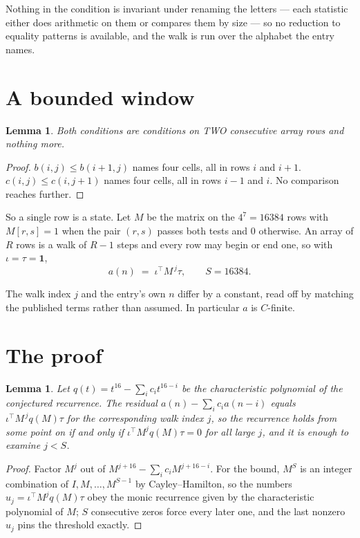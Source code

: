 \documentclass[11pt,a4paper]{article}
\theoremstyle{plain}
\newtheorem{lemma}[theorem]{Lemma}
\theoremstyle{definition}
\begin{document}
Nothing in the condition is invariant under renaming the letters --- each statistic either does
arithmetic on them or compares them by size --- so no reduction to equality patterns is
available, and the walk is run over the alphabet the entry names.

\section{A bounded window}

\begin{lemma}\label{lem:win}
Both conditions are conditions on TWO consecutive array rows and nothing more.
\end{lemma}

\begin{proof}
$b(i,j)\le b(i{+}1,j)$ names four cells, all in rows $i$ and $i+1$. $c(i,j)\le c(i,j{+}1)$
names four cells, all in rows $i-1$ and $i$. No comparison reaches further.
\end{proof}

So a single row is a state. Let $M$ be the matrix on the $4^{7}=16384$ rows with
$M[r,s]=1$ when the pair $(r,s)$ passes both tests and $0$ otherwise. An array of $R$ rows is a
walk of $R-1$ steps and every row may begin or end one, so with $\iota=\tau=\mathbf{1}$,
\[
a(n)\;=\;\iota^{\!\top}M^{\,j}\tau ,\qquad S=16384.
\]

The walk index $j$ and the entry's own $n$ differ by a constant, read off by matching the
published terms rather than assumed. In particular $a$ is $C$-finite.

\section{The proof}

\begin{lemma}\label{lem:crit}
Let $q(t)=t^{16}-\sum_i c_it^{16-i}$ be the characteristic polynomial of the
conjectured recurrence. The residual $a(n)-\sum_ic_ia(n-i)$ equals
$\iota^{\!\top}M^{\,j}q(M)\tau$ for the corresponding walk index $j$, so the recurrence
holds from some point on if and only if $\iota^{\!\top}M^{j}q(M)\tau=0$ for all large $j$,
and it is enough to examine $j<S$.
\end{lemma}

\begin{proof}
Factor $M^{j}$ out of $M^{j+16}-\sum_ic_iM^{j+16-i}$. For the bound, $M^{S}$
is an integer combination of $I,M,\dots,M^{S-1}$ by Cayley--Hamilton, so the numbers
$u_j=\iota^{\!\top}M^{j}q(M)\tau$ obey the monic recurrence given by the characteristic
polynomial of $M$; $S$ consecutive zeros force every later one, and the last nonzero $u_j$
pins the threshold exactly.
\end{proof}
\end{document}
